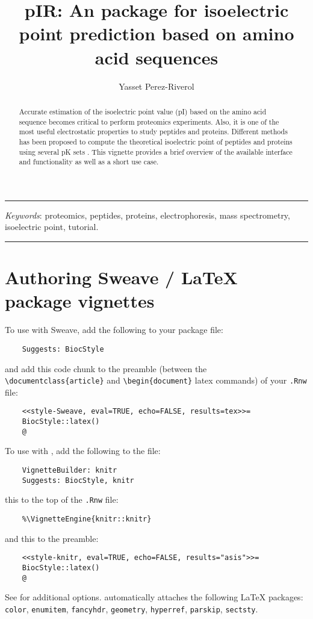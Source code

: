 \documentclass{article}
\title{pIR: An \R{} package for isoelectric point prediction based on amino acid sequences}
\author{Yasset Perez-Riverol}
\begin{document}


\maketitle


\hrule
\begin{abstract}
   Accurate estimation of the isoelectric point value (pI) based on the amino acid sequence becomes critical to perform proteomics experiments. Also, it is one of the most useful electrostatic properties to study peptides and proteins. Different methods has been proposed to compute the theoretical isoelectric point of peptides and proteins using several pK sets \cite{perez2012, cargile2008, bjellqvist1993}. This vignette provides a brief overview of the available interface and functionality as well as a short use case.
\end{abstract}

\textit{Keywords}: proteomics, peptides, proteins, electrophoresis, mass spectrometry, isoelectric point, tutorial.
\hrule
{}
\vspace{10mm}


\tableofcontents

\section{Authoring Sweave / \LaTeX{} package vignettes}

To use with Sweave, add the following to your package  file:
\begin{verbatim}
    Suggests: BiocStyle
\end{verbatim}
and add this code chunk to the preamble (between the
\verb+\documentclass{article}+ and \verb+\begin{document}+ latex
commands) of your \texttt{.Rnw} file:
\begin{verbatim}
    <<style-Sweave, eval=TRUE, echo=FALSE, results=tex>>=
    BiocStyle::latex()
    @
\end{verbatim}

To use with , add the following to the  file:
\begin{verbatim}
    VignetteBuilder: knitr
    Suggests: BiocStyle, knitr
\end{verbatim}
this to the top of the \texttt{.Rnw} file:
\begin{verbatim}
    %\VignetteEngine{knitr::knitr}
\end{verbatim}
and this to the preamble:
\begin{verbatim}
    <<style-knitr, eval=TRUE, echo=FALSE, results="asis">>=
    BiocStyle::latex()
    @
\end{verbatim}
See  for additional options. 
automatically attaches the following \LaTeX{} packages:
\texttt{color}, \texttt{enumitem}, \texttt{fancyhdr},
\texttt{geometry}, \texttt{hyperref}, \texttt{parskip}, \texttt{sectsty}.
\end{document}

